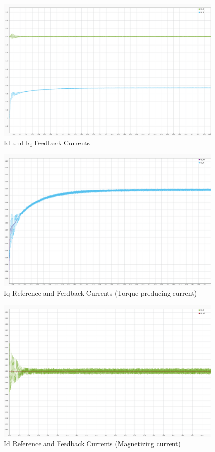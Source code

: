 \begin{figure}[H]
	\centering
	\includegraphics[width=6in]{sections/section3/images/simulationResutls/Id_fb_Iq_fb.png}
	\caption{Id and Iq Feedback Currents}
\end{figure}

\begin{figure}[H]
	\centering
	\includegraphics[width=6in]{sections/section3/images/simulationResutls/Iq_ref_fb.png}
	\caption{Iq Reference and Feedback Currents (Torque producing current)}
\end{figure}

\begin{figure}[H]
	\centering
	\includegraphics[width=6in]{sections/section3/images/simulationResutls/Id_ref_fb.png}
	\caption{Id Reference and Feedback Currents (Magnetizing current)}
\end{figure}

\newpage